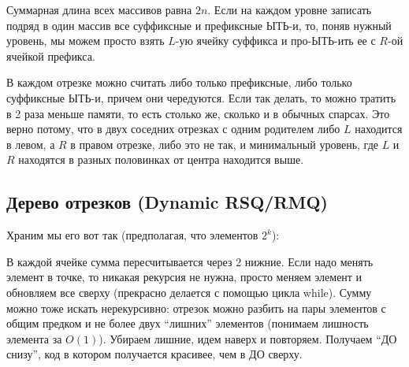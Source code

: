 \begin{note}
    Суммарная длина всех массивов равна $2n$. Если на каждом уровне записать подряд в один массив все суффиксные и префиксные ЫТЬ-и, то, поняв нужный уровень, мы можем просто взять $L$-ую ячейку суффикса и про-ЫТЬ-ить ее с $R$-ой ячейкой префикса.
\end{note}

\begin{note}
    В каждом отрезке можно считать либо только префиксные, либо только суффиксные ЫТЬ-и, причем они чередуются. Если так делать, то можно тратить в 2 раза меньше памяти, то есть столько же, сколько и в обычных спарсах. Это верно потому, что в двух соседних отрезках с одним родителем либо $L$ находится в левом, а $R$ в правом отрезке, либо это не так, и минимальный уровень, где $L$ и $R$ находятся в разных половинках от центра находится выше. 
\end{note}


\subsection{Дерево отрезков (Dynamic RSQ/RMQ)}


Храним мы его вот так (предполагая, что элементов $2^k$):
\begin{center} 
\end{center}

В каждой ячейке сумма пересчитывается через 2 нижние. Если надо менять элемент в точке, то никакая рекурсия не нужна, просто меняем элемент и обновляем все сверху (прекрасно делается с помощью цикла while). Сумму можно тоже искать нерекурсивно: отрезок можно разбить на пары элементов с общим предком и не более двух ``лишних'' элементов (понимаем лишность элемента за $O(1)$). Убираем лишние, идем наверх и повторяем. Получаем ``ДО снизу'', код в котором получается красивее, чем в ДО сверху.